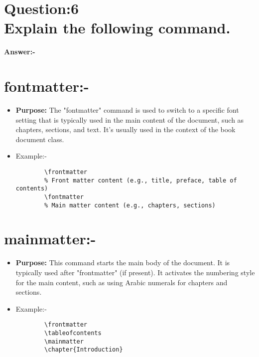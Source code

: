 \newpage
\raggedright
\setcounter{section}{0}
\section*{Question:6 \\ Explain the following command.}
\textbf{Answer:-}
\section{fontmatter:- }
\begin{itemize}
    \item \textbf{Purpose:}  The "fontmatter" command is used to switch to a specific font setting that is typically used in the main content of the document, such as chapters, sections, and text. It's usually used in the context of the book document class.
    \item Example:-
    \begin{verbatim}
        \frontmatter
        % Front matter content (e.g., title, preface, table of contents)
        \fontmatter
        % Main matter content (e.g., chapters, sections)

    \end{verbatim}
\end{itemize}

\section{mainmatter:- }
\begin{itemize}
    \item \textbf{Purpose:}  This command starts the main body of the document. It is typically used after "frontmatter" (if present). It activates the numbering style for the main content, such as using Arabic numerals for chapters and sections.
    \item Example:-
    \begin{verbatim}
        \frontmatter
        \tableofcontents
        \mainmatter
        \chapter{Introduction}
    \end{verbatim}
\end{itemize}

